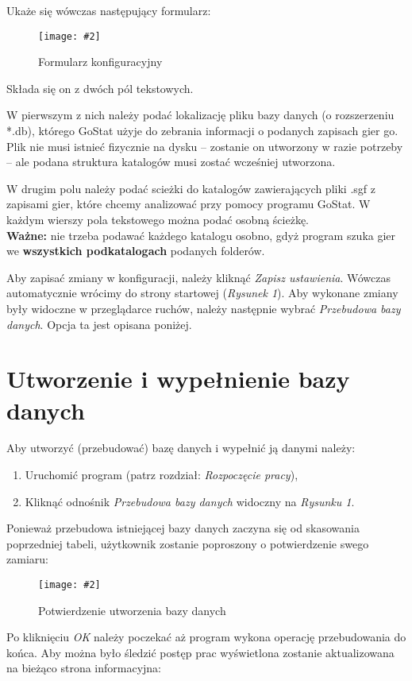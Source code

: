 \documentclass[10pt,leqno]{article}
\newcommand{\myimage}[3]{
  \begin{figure}[h!]
    \centering
      \texttt{[image: \#2]}
  \caption{#3}
  \end{figure}
}
\begin{document}
Ukaże się wówczas następujący formularz:

\myimage{0.4}{formularz.png}{Formularz konfiguracyjny}

Składa się on z dwóch pól tekstowych. 

W pierwszym z nich należy podać lokalizację pliku bazy danych (o rozszerzeniu *.db), którego GoStat użyje do zebrania informacji o podanych zapisach gier go.
Plik nie musi istnieć fizycznie na dysku -- zostanie on utworzony w razie potrzeby -- ale podana struktura katalogów musi zostać wcześniej utworzona.

W drugim polu należy podać scieżki do katalogów zawierających pliki .sgf z zapisami gier, które chcemy analizować przy pomocy
programu GoStat. W każdym wierszy pola tekstowego można podać osobną ścieżkę. \\
\textbf{Ważne:} nie trzeba podawać każdego katalogu osobno, gdyż program szuka gier we \textbf{wszystkich podkatalogach} podanych folderów.

Aby zapisać zmiany w konfiguracji, należy kliknąć \emph{Zapisz ustawienia}. Wówczas automatycznie wrócimy do strony startowej (\emph{Rysunek 1}). 
Aby wykonane zmiany były widoczne w przeglądarce ruchów, należy następnie wybrać \emph{Przebudowa bazy danych}. Opcja ta jest opisana poniżej.

\newpage

\section{Utworzenie i wypełnienie bazy danych}
Aby utworzyć (przebudować) bazę danych i wypełnić ją danymi należy: 
\begin{enumerate}
\item Uruchomić program (patrz rozdział: \emph{Rozpoczęcie pracy}),
\item Kliknąć odnośnik \emph{Przebudowa bazy danych} widoczny na \emph{Rysunku 1}.
\end{enumerate}

Ponieważ przebudowa istniejącej bazy danych zaczyna się od skasowania poprzedniej tabeli, użytkownik zostanie
poproszony o potwierdzenie swego zamiaru:

\myimage{1.0}{potwierdzenie.png}{Potwierdzenie utworzenia bazy danych}

Po kliknięciu \emph{OK} należy poczekać aż program wykona operację przebudowania do końca. 
Aby można było śledzić postęp prac wyświetlona zostanie aktualizowana na bieżąco strona informacyjna:
\end{document}
